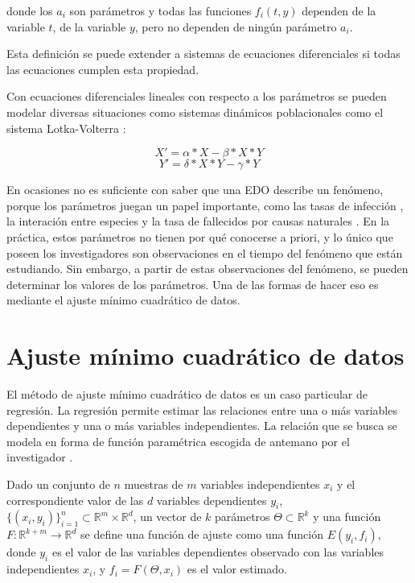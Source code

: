 donde los $a_i$ son parámetros y todas las funciones $f_i(t,y)$ dependen de la variable $t$, de la variable $y$, pero no dependen de ningún parámetro $a_i$.

Esta definición se puede extender a sistemas de ecuaciones diferenciales si todas las ecuaciones cumplen esta propiedad.

Con ecuaciones diferenciales lineales con respecto a los parámetros se pueden modelar diversas situaciones como sistemas dinámicos poblacionales como el sistema Lotka-Volterra \cite{Hoppensteadt:2006}:

$$X' = \alpha * X - \beta * X * Y$$
$$Y' = \delta * X * Y - \gamma * Y$$

En ocasiones no es suficiente con saber que una EDO describe un fenómeno, porque los parámetros juegan un papel importante, como las tasas de infección \cite{weiss2013sir}, la interación entre especies \cite{gaucel2014learning} y la tasa de fallecidos por causas naturales \cite{kuddus2021mathematical}. En la práctica, estos parámetros no tienen por qué conocerse a priori, y lo único que poseen los investigadores son observaciones en el tiempo del fenómeno que están estudiando. Sin embargo, a partir de estas observaciones del fenómeno, se pueden determinar los valores de los parámetros. Una de las formas de hacer eso es mediante el ajuste mínimo cuadrático de datos.

\section{Ajuste mínimo cuadrático de datos}\label{section:min_square}

El método de ajuste mínimo cuadrático de datos es un caso particular de regresión. La regresión permite estimar las relaciones entre una o más variables dependientes y una o más variables independientes. La relación que se busca se modela en forma de función paramétrica escogida de antemano por el investigador \cite{johnson2015applied}.

Dado un conjunto de $n$ muestras de $m$ variables independientes $x_i$ y el correspondiente valor de las $d$ variables dependientes $y_i$, $\{(x_i, y_i)\}^n_{i=1} \subset \mathbb{R}^m \times \mathbb{R}^d$, un vector de $k$ parámetros $\Theta \subset \mathbb{R}^k$ y una función $F : \mathbb{R}^{k + m} \rightarrow \mathbb{R}^d$ se define una función de ajuste como una función $E(y_i, f_i)$, donde $y_i$ es el valor de las variables dependientes observado con las variables independientes $x_i$, y $f_i = F(\Theta, x_i)$ es el valor estimado.

